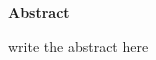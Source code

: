 \thispagestyle{plain}
\begin{center}
    \Huge
    \textbf{Abstract}
\end{center}

write the abstract here

\newpage